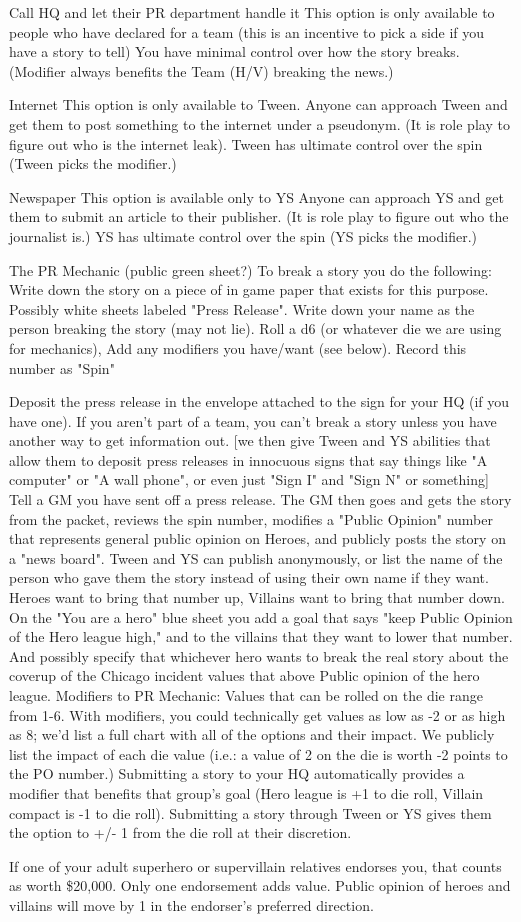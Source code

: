 \documentclass[green]{LRSguildcamp1}
\begin{document}
\name{\gPR{}}
Call HQ and let their PR department handle it
This option is only available to people who have declared for a team (this is an incentive to pick a side if you have a story to tell)
You have minimal control over how the story breaks. (Modifier always benefits the Team (H/V) breaking the news.)

Internet
This option is only available to Tween.
Anyone can approach Tween and get them to post something to the internet under a pseudonym. (It is role play to figure out who is the internet leak). Tween has ultimate control over the spin (Tween picks the modifier.)

Newspaper
This option is available only to YS
Anyone can approach YS and get them to submit an article to their publisher. (It is role play to figure out who the journalist is.) YS has ultimate control over the spin (YS picks the modifier.)

The PR Mechanic (public green sheet?)
To break a story you do the following:
Write down the story on a piece of in game paper that exists for this purpose. Possibly white sheets labeled "Press Release".
Write down your name as the person breaking the story (may not lie).
Roll a d6 (or whatever die we are using for mechanics), Add any modifiers you have/want (see below). Record this number as "Spin"


Deposit the press release in the envelope attached to the sign for your HQ (if you have one). If you aren't part of a team, you can't break a story unless you have another way to get information out.  [we then give Tween and YS abilities that allow them to deposit press releases in innocuous signs that say things like "A computer" or "A wall phone", or even just "Sign I" and "Sign N" or something]
Tell a GM you have sent off a press release.
The GM then goes and gets the story from the packet, reviews the spin number, modifies a "Public Opinion" number that represents general public opinion on Heroes, and publicly posts the story on a "news board". Tween and YS can publish anonymously, or list the name of the person who gave them the story instead of using their own name if they want. 
Heroes want to bring that number up, Villains want to bring that number down.  On the "You are a hero" blue sheet you add a goal that says "keep Public Opinion of the Hero league high," and to the villains that they want to lower that number.  And possibly specify that whichever hero wants to break the real story about the coverup of the Chicago incident values that above Public opinion of the hero league.
Modifiers to PR Mechanic:
Values that can be rolled on the die range from 1-6. With modifiers, you could technically get values as low as -2 or as high as 8; we'd list a full chart with all of the options and their impact. We publicly list the impact of each die value (i.e.: a value of 2 on the die is worth -2 points to the PO number.)
Submitting a story to your HQ automatically provides a modifier that benefits that group's goal (Hero league is +1 to die roll, Villain compact is -1 to die roll).
Submitting a story through Tween or YS gives them the option to +/- 1 from the die roll at their discretion.

If one of your adult superhero or supervillain relatives endorses you, that counts as worth \$20,000.  Only one endorsement adds value.
Public opinion of heroes and villains will move by 1 in the endorser's preferred direction.
\end{document}

